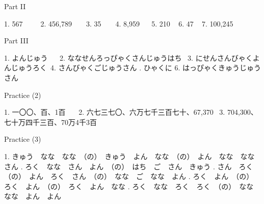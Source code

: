\par{Part II }

\par{1. 567      2. 456,789     3. 35     4. 8,959    5. 210   6. 47   7. 100,245 }

\par{Part III }

\par{1. よんじゅう    2. ななせんろっぴゃくさんじゅうはち  3. にせんさんびゃくよんじゅうろく 4. さんびゃくごじゅうさん \hfill{}. ひゃくに  6. はっぴゃくきゅうじゅうさん }

\par{Practice (2) }

\par{1. 一〇〇、百、1百  　2. 六七三七〇、六万七千三百七十、67,370  3. 704,300、七十万四千三百、70万4千3百 }

\par{Practice (3) }

\par{1. きゅう　なな　なな　（の）　きゅう　よん　なな　（の）　よん　なな　なな　さん \hfill{}. ろく　なな　さん　よん　（の）　はち　ご　さん　きゅう \hfill{}. さん　ろく　（の）　よん　ろく　さん　（の）　なな　ご　なな　よん \hfill{}. ろく　よん　（の）　ろく　よん　（の）　ろく　よん　なな \hfill{}. ろく　なな　ろく　ろく　（の）　なな　なな　よん　よん }
    